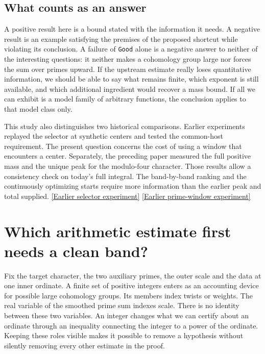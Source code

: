 \documentclass[12pt,letterpaper]{article}
\begin{document}
\subsection{What counts as an answer}
A positive result here is a bound stated with the information it needs. A negative result is an example satisfying the premises of the proposed shortcut while violating its conclusion. A failure of \texttt{Good} alone is a negative answer to neither of the interesting questions: it neither makes a cohomology group large nor forces the sum over primes upward. If the upstream estimate really loses quantitative information, we should be able to say what remains finite, which exponent is still available, and which additional ingredient would recover a mass bound. If all we can exhibit is a model family of arbitrary functions, the conclusion applies to that model class only.

This study also distinguishes two historical comparisons. Earlier experiments replayed the selector at synthetic centers and tested the common-host requirement. The present question concerns the cost of using a window that encounters a center. Separately, the preceding paper measured the full positive mass and the unique peak for the modulo-four character. Those results allow a consistency check on today's full integral. The band-by-band ranking and the continuously optimizing starts require more information than the earlier peak and total supplied. \href{https://github.com/nousentllc/riemann-hypothesis/blob/bafda6a5728eb08b601943f0c9cb1d38d27c03a9/research/uriel/experiments/joint-witness/COMPUTATION.md}{[Earlier selector experiment]} \href{https://github.com/nousentllc/riemann-hypothesis/blob/b7b5bc6e5e6814f654753fcbd5f45fecf370344c/research/uriel/experiments/zero-and-arithmetic-windows/README.md}{[Earlier prime-window experiment]}


\section{Which arithmetic estimate first needs a clean band?}
\label{sec:band-upstream}
Fix the target character, the two auxiliary primes, the outer scale and the data at one inner ordinate. A finite set of positive integers enters as an accounting device for possible large cohomology groups. Its members index twists or weights. The real variable of the smoothed prime sum indexes scale. There is no identity between these two variables. An integer changes what we can certify about an ordinate through an inequality connecting the integer to a power of the ordinate. Keeping these roles visible makes it possible to remove a hypothesis without silently removing every other estimate in the proof.
\end{document}

